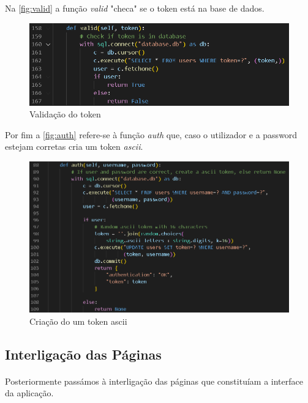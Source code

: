 \documentclass[a4paper, 11pt, oneside]{report}
\begin{document}
\newpage

\indent Na \autoref{fig:valid} a função \textit{valid} "checa" se o token está na base de dados.

\begin{figure}[h]
\center
\includegraphics[width=320pt]{validDB.png}
\caption{Validação do token}
\label{fig:valid}
\end{figure}

\indent Por fim a \autoref{fig:auth} refere-se à função \textit{auth} que, caso o utilizador e a password estejam corretas cria um token \textit{\ac{ascii}}.

\newpage

\begin{figure}[h]
\center
\includegraphics[width=320pt]{authDB.png}
\caption{Criação do um token \ac{ascii}}
\label{fig:auth}
\end{figure}

\subsection{Interligação das Páginas}

\paragraph{} Posteriormente passámos à interligação das páginas que constituíam a interface da aplicação. 
\end{document}
